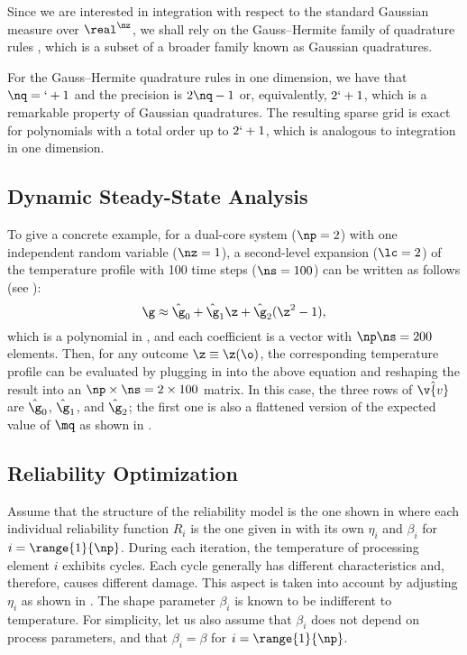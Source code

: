 Since we are interested in integration with respect to the standard Gaussian
measure over $\real^\nz$, we shall rely on the Gauss--Hermite family of
quadrature rules \cite{maitre2010}, which is a subset of a broader family known
as Gaussian quadratures.

For the Gauss--Hermite quadrature rules in one dimension, we have that $\nq =
\lq + 1$ and the precision is $2 \nq - 1$ \cite{heiss2008} or, equivalently, $2
\lq + 1$, which is a remarkable property of Gaussian quadratures. The resulting
sparse grid is exact for polynomials with a total order up to $2 \lq + 1$, which
is analogous to integration in one dimension.

\subsection{Dynamic Steady-State Analysis}

To give a concrete example, for a dual-core system ($\np = 2$) with one
independent random variable ($\nz = 1$), a second-level expansion ($\lc = 2$) of
the temperature profile with 100 time steps ($\ns = 100$) can be written as
follows (see ):
\[
  \g \approx \hat{\g}_0 + \hat{\g}_1 \z + \hat{\g}_2(\z^2 - 1),
\]
which is a polynomial in \z, and each coefficient is a vector with $\np \ns =
200$ elements. Then, for any outcome $\z \equiv \z(\o)$, the corresponding
temperature profile \mq can be evaluated by plugging in \z into the above
equation and reshaping the result into an $\np \times \ns = 2 \times 100$
matrix. In this case, the three rows of $\hat{\v{v}}$ are $\hat{\g}_0$,
$\hat{\g}_1$, and $\hat{\g}_2$; the first one is also a flattened version of the
expected value of $\mq$ as shown in .

\subsection{Reliability Optimization}

Assume that the structure of the reliability model is the one shown in
 where each individual reliability function $R_i$ is the
one given in  with its own $\eta_i$ and $\beta_i$ for
$i = \range{1}{\np}$. During each iteration, the temperature of processing
element $i$ exhibits  cycles. Each cycle generally has different
characteristics and, therefore, causes different damage. This aspect is taken
into account by adjusting $\eta_i$ as shown in . The
shape parameter $\beta_i$ is known to be indifferent to temperature. For
simplicity, let us also assume that $\beta_i$ does not depend on process
parameters, and that $\beta_i = \beta$ for $i = \range{1}{\np}$.

